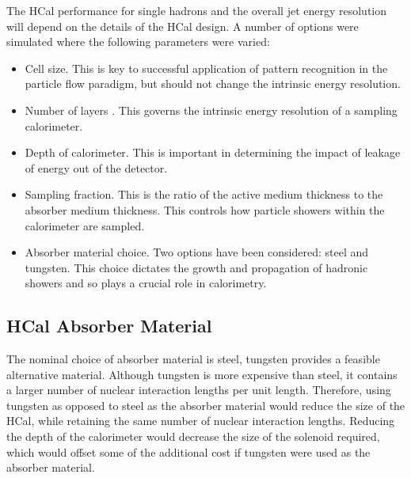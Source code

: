 
The HCal performance for single hadrons and the overall jet energy resolution will depend on the details of the HCal design.  A number of options were simulated where the following parameters were varied:
\begin{itemize}
\item Cell size.  This is key to successful application of pattern recognition in the particle flow paradigm, but should not change the intrinsic energy resolution.   
\item Number of layers .  This governs the intrinsic energy resolution of a sampling calorimeter.
\item Depth of calorimeter.  This is important in determining the impact of leakage of energy out of the detector.  
\item Sampling fraction.  This is the ratio of the active medium thickness to the absorber medium thickness.  This controls how particle showers within the calorimeter are sampled.
\item Absorber material choice.  Two options have been considered: steel and tungsten.  This choice dictates the growth and propagation of hadronic showers and so plays a crucial role in calorimetry.  
\end{itemize}


\subsection{HCal Absorber Material}
\label{sec:hcalabsorbermaterial}

The nominal choice of absorber material is steel, tungsten provides a feasible alternative material.  Although tungsten is more expensive than steel, it contains a larger number of nuclear interaction lengths per unit length.  Therefore, using tungsten as opposed to steel as the absorber material would reduce the size of the HCal, while retaining the same number of nuclear interaction lengths.  Reducing the depth of the calorimeter would decrease the size of the solenoid required, which would offset some of the additional cost if tungsten were used as the absorber material. 

